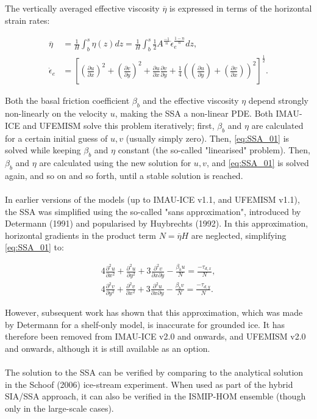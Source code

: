 \documentclass{article}
\begin{document}
The vertically averaged effective viscosity $\overline{\eta}$ is expressed in terms of the horizontal strain rates:

\begin{align} \label{eq:SSA_02}
\overline{\eta} &= \frac{1}{H} \int_b^s \eta(z) dz 
= \frac{1}{H} \int_b^s \frac12 A^{\frac{-1}{n}} \dot{\epsilon}_e^{\frac{1-n}{n}} dz, \\
{\dot{\epsilon}}_e &= {\left[ {\left( \frac{\partial u}{\partial x} \right) }^2 + {\left( \frac{\partial v}{\partial y} \right) }^2 + \frac{\partial u}{\partial x} \frac{\partial v}{\partial y} + \frac14 {\left( {\left( \frac{\partial u}{\partial y} \right) } + {\left( \frac{\partial v}{\partial x} \right) } \right)}^2 \right] }^{\frac12}.
\end{align}

Both the basal friction coefficient $\beta_b$ and the effective viscosity $\eta$ depend strongly non-linearly on the velocity $u$, making the SSA a non-linear PDE. Both IMAU-ICE and UFEMISM solve this problem iteratively; first, $\beta_b$ and $\eta$ are calculated for a certain initial guess of $u,v$ (usually simply zero). Then, \eqref{eq:SSA_01} is solved while keeping $\beta_b$ and $\eta$ constant (the so-called "linearised" problem). Then, $\beta_b$ and $\eta$ are calculated using the new solution for $u,v$, and \eqref{eq:SSA_01} is solved again, and so on and so forth, until a stable solution is reached.\\
\\
In earlier versions of the models (up to IMAU-ICE v1.1, and UFEMISM v1.1), the SSA was simplified using the so-called "sans approximation", introduced by Determann (1991) and popularised by Huybrechts (1992). In this approximation, horizontal gradients in the product term $N = \overline{\eta} H$ are neglected, simplifying \eqref{eq:SSA_01} to:

\begin{align} \label{eq:SSA_03}
4 \frac{\partial^2 u}{\partial x^2} + \frac{\partial^2 u}{\partial y^2} + 3 \frac{\partial^2 v}{\partial x \partial y}
- \frac{\beta_b u}{N} = \frac{-\tau_{d,x}}{N}, \\
4 \frac{\partial^2 v}{\partial y^2} + \frac{\partial^2 v}{\partial x^2} + 3 \frac{\partial^2 u}{\partial x \partial y}
- \frac{\beta_b v}{N} = \frac{-\tau_{d,y}}{N}.
\end{align}

However, subsequent work has shown that this approximation, which was made by Determann for a shelf-only model, is inaccurate for grounded ice. It has therefore been removed from IMAU-ICE v2.0 and onwards, and UFEMISM v2.0 and onwards, although it is still available as an option.\\
\\
The solution to the SSA can be verified by comparing to the analytical solution in the Schoof (2006) ice-stream experiment. When used as part of the hybrid SIA/SSA approach, it can also be verified in the ISMIP-HOM ensemble (though only in the large-scale cases).
\end{document}
